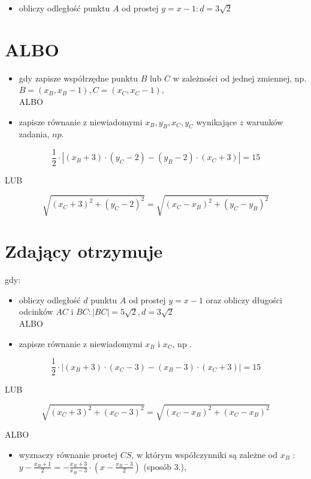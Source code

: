 \documentclass[10pt]{article}
\begin{document}
\begin{itemize}
  \item obliczy odległość punktu $A$ od prostej $y=x-1: d=3 \sqrt{2}$
\end{itemize}

\section*{ALBO}
\begin{itemize}
  \item gdy zapisze współrzędne punktu $B$ lub $C$ w zależności od jednej zmiennej, np. $B=\left(x_{B}, x_{B}-1\right), C=\left(x_{C}, x_{C}-1\right)$,\\
ALBO
  \item zapisze równanie z niewiadomymi $x_{B}, y_{B}, x_{C}, y_{C}$ wynikające $z$ warunków zadania, $n p$.
\end{itemize}

$$
\frac{1}{2} \cdot\left|\left(x_{B}+3\right) \cdot\left(y_{C}-2\right)-\left(y_{B}-2\right) \cdot\left(x_{C}+3\right)\right|=15
$$

LUB

$$
\sqrt{\left(x_{C}+3\right)^{2}+\left(y_{C}-2\right)^{2}}=\sqrt{\left(x_{C}-x_{B}\right)^{2}+\left(y_{C}-y_{B}\right)^{2}}
$$

\section*{Zdający otrzymuje}
gdy:

\begin{itemize}
  \item obliczy odległość $d$ punktu $A$ od prostej $y=x-1$ oraz obliczy długości odcinków $A C$ i $B C:|B C|=5 \sqrt{2}, d=3 \sqrt{2}$\\
ALBO
  \item zapisze równanie z niewiadomymi $x_{B}$ i $x_{C}$, np .
\end{itemize}

$$
\frac{1}{2} \cdot\left|\left(x_{B}+3\right) \cdot\left(x_{C}-3\right)-\left(x_{B}-3\right) \cdot\left(x_{C}+3\right)\right|=15
$$

LUB

$$
\sqrt{\left(x_{C}+3\right)^{2}+\left(x_{C}-3\right)^{2}}=\sqrt{\left(x_{C}-x_{B}\right)^{2}+\left(x_{C}-x_{B}\right)^{2}}
$$

ALBO

\begin{itemize}
  \item wyznaczy równanie prostej $C S$, w którym współczynniki są zależne od $x_{B}$ : $y-\frac{x_{B}+1}{2}=-\frac{x_{B}+3}{x_{B}-3} \cdot\left(x-\frac{x_{B}-3}{2}\right)$ (sposób 3.),
\end{itemize}
\end{document}
